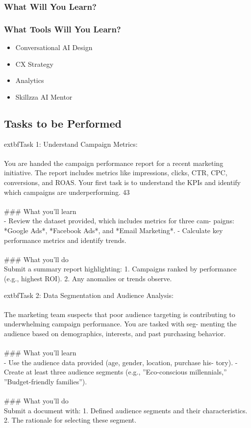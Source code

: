 \documentclass{article}
\begin{document}
\subsubsection*{What Will You Learn?}
\begin{itemize}
\end{itemize}

\subsubsection*{What Tools Will You Learn?}
\begin{itemize}
    \item Conversational AI Design
    \item CX Strategy
    \item Analytics
    \item Skillzza AI Mentor
\end{itemize}

\subsection*{Tasks to be Performed}
	extbf{Task 1:} Understand Campaign Metrics:  \\
 \\
 You are handed the campaign performance report for a recent marketing initiative. The report includes metrics like impressions, clicks, CTR, CPC, conversions, and ROAS. Your first task is to understand the KPIs and identify which campaigns are underperforming. 43 \\
 \\
### What you'll learn \\
- Review the dataset provided, which includes metrics for three cam- paigns: *Google Ads*, *Facebook Ads*, and *Email Marketing*. - Calculate key performance metrics and identify trends. \\
 \\
### What you'll do \\
Submit a summary report highlighting: 1. Campaigns ranked by performance (e.g., highest ROI). 2. Any anomalies or trends observe.

	extbf{Task 2:} Data Segmentation and Audience Analysis:  \\
 \\
 The marketing team suspects that poor audience targeting is contributing to underwhelming campaign performance. You are tasked with seg- menting the audience based on demographics, interests, and past purchasing behavior. \\
 \\
### What you'll learn \\
- Use the audience data provided (age, gender, location, purchase his- tory). - Create at least three audience segments (e.g., ”Eco-conscious millennials,” ”Budget-friendly families”). \\
 \\
### What you'll do \\
Submit a document with: 1. Defined audience segments and their characteristics. 2. The rationale for selecting these segment.
\end{document}
